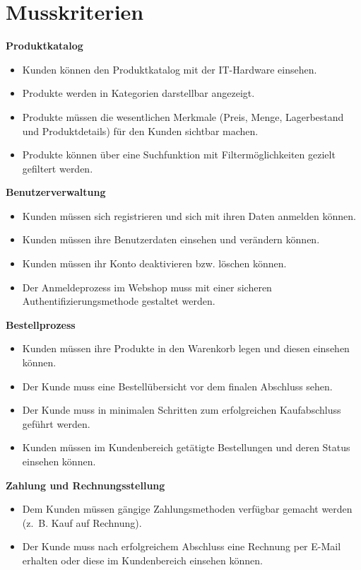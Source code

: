 \documentclass[%
	12pt,
	a4paper,
	oneside,
	parskip=full
]{scrbook}
\begin{document}
\section{Musskriterien}
	\vspace{0.5cm}
	\textbf{Produktkatalog}
	\begin{itemize}
		\item Kunden können den Produktkatalog mit der IT-Hardware einsehen.
		\item Produkte werden in Kategorien darstellbar angezeigt.
		\item Produkte müssen die wesentlichen Merkmale (Preis, Menge, Lagerbestand und Produktdetails) für den Kunden sichtbar machen.
		\item Produkte können über eine Suchfunktion mit Filtermöglichkeiten gezielt gefiltert werden.
	\end{itemize}

	\vspace{0.5cm}
	\textbf{Benutzerverwaltung}
	\begin{itemize}
		\item Kunden müssen sich registrieren und sich mit ihren Daten anmelden können.
		\item Kunden müssen ihre Benutzerdaten einsehen und verändern können.
		\item Kunden müssen ihr Konto deaktivieren bzw. löschen können.
		\item Der Anmeldeprozess im Webshop muss mit einer sicheren Authentifizierungsmethode gestaltet werden.
	\end{itemize}

	\vspace{0.5cm}
	\textbf{Bestellprozess}
	\begin{itemize}
		\item Kunden müssen ihre Produkte in den Warenkorb legen und diesen einsehen können.
		\item Der Kunde muss eine Bestellübersicht vor dem finalen Abschluss sehen.
		\item Der Kunde muss in minimalen Schritten zum erfolgreichen Kaufabschluss geführt werden.
		\item Kunden müssen im Kundenbereich getätigte Bestellungen und deren Status einsehen können.
	\end{itemize}

	\vspace{0.5cm}
	\textbf{Zahlung und Rechnungsstellung}
	\begin{itemize}
		\item Dem Kunden müssen gängige Zahlungsmethoden verfügbar gemacht werden (z.~B. Kauf auf Rechnung).
		\item Der Kunde muss nach erfolgreichem Abschluss eine Rechnung per E-Mail erhalten oder diese im Kundenbereich einsehen können.
	\end{itemize}
\end{document}
